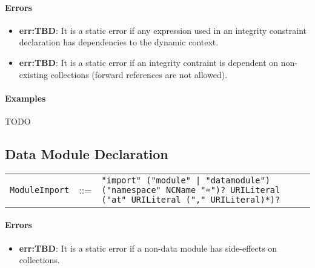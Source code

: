 \documentclass[]{article}
\begin{document}
\paragraph{Errors}
\begin{itemize}
  \item \textbf{err:TBD}: It is a static error if any expression used in an integrity constraint declaration has dependencies to the dynamic context.
  \item \textbf{err:TBD}: It is a static error if an integrity contraint is dependent on non-existing collections (forward references are not allowed).
\end{itemize}

\paragraph{Examples}
TODO

\subsection{Data Module Declaration}
\begin{tabular}{l c p{12cm}}
{\tt ModuleImport} & ::= & {\tt "import" ("module" | "datamodule") ("namespace" NCName "=")? URILiteral ("at" URILiteral ("," URILiteral)*)? }
\end{tabular}

\vspace{0.5cm}

\paragraph{Errors}
\begin{itemize}
  \item \textbf{err:TBD}: It is a static error if a non-data module has side-effects on collections.
\end{itemize}
\end{document}
